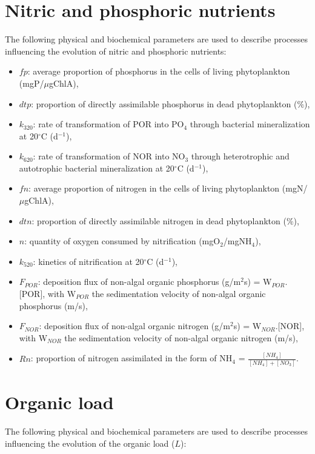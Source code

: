 \section{Nitric and phosphoric nutrients}

The following physical and biochemical parameters are used to describe processes
influencing the evolution of nitric and phosphoric nutrients:

\begin{itemize}
\item $fp$: average proportion of phosphorus in the cells of living phytoplankton (mgP/$\mu$gChlA),
\item $dtp$: proportion of directly assimilable phosphorus in dead phytoplankton ($\%$),
\item $k_{320}$: rate of transformation of POR into PO$_4$ through bacterial mineralization
  at 20$^{\circ}$C (d$^{-1}$),
\item $k_{620}$: rate of transformation of NOR into NO$_3$ through heterotrophic and autotrophic
  bacterial mineralization at 20$^{\circ}$C (d$^{-1}$),
\item $fn$: average proportion of nitrogen in the cells of living phytoplankton (mgN/$\mu$gChlA),
\item $dtn$: proportion of directly assimilable nitrogen in dead phytoplankton ($\%$),
\item $n$: quantity of oxygen consumed by nitrification (mgO$_2$/mgNH$_4$),
\item $k_{520}$: kinetics of nitrification at 20$^{\circ}$C (d$^{-1}$),
\item $F_{POR}$: deposition flux of non-algal organic phosphorus (g/m$^2$s) = W$_{POR}$.[POR],
  with W$_{POR}$ the sedimentation velocity of non-algal organic phosphorus (m/s),
\item $F_{NOR}$: deposition flux of non-algal organic nitrogen (g/m$^2$s) = W$_{NOR}$.[NOR],
  with W$_{NOR}$ the sedimentation velocity of non-algal organic nitrogen (m/s),
\item $Rn$: proportion of nitrogen assimilated in the form of NH$_4$ = $\frac{[NH_4]}{[NH_4]+[NO_3]}$.
\end{itemize}

\section{Organic load}

The following physical and biochemical parameters are used to describe processes
influencing the evolution of the organic load ($L$):

